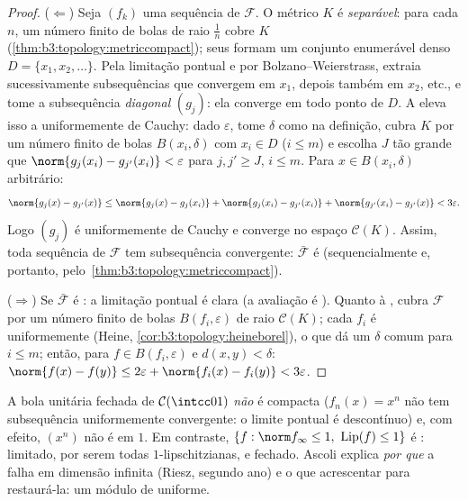 \begin{proof}
($\Leftarrow$) Seja $(f_k)$ uma sequência de $\mathcal F$. O  métrico
$K$ é \emph{separável}: para cada $n$, um número finito de bolas
de raio $\frac1n$ cobre $K$ (\cref{thm:b3:topology:metriccompact}); seus  formam um
conjunto enumerável denso $D = \{x_1, x_2, \dots\}$. Pela limitação pontual e por
Bolzano--Weierstrass, extraia sucessivamente subsequências que
convergem em $x_1$, depois também em $x_2$, etc., e tome a
subsequência \emph{diagonal} $(g_j)$: ela converge em todo ponto de
$D$. A  eleva isso a uniformemente de Cauchy: dado
$\varepsilon$, tome $\delta$ como na definição, cubra $K$ por um número
finito de bolas $B(x_i, \delta)$ com $x_i \in D$ ($i \leq m$) e escolha $J$ tão grande que
$\norm{g_j(x_i) - g_{j'}(x_i)} < \varepsilon$ para $j, j' \geq
J$, $i \leq m$. Para $x \in B(x_i, \delta)$ arbitrário:
\[
\norm{g_j(x) - g_{j'}(x)}
\leq \norm{g_j(x) - g_j(x_i)} + \norm{g_j(x_i) - g_{j'}(x_i)}
+ \norm{g_{j'}(x_i) - g_{j'}(x)} < 3\varepsilon .
\]
Logo $(g_j)$ é uniformemente de Cauchy e converge no espaço 
$\mathcal C(K)$. Assim, toda sequência de $\mathcal F$ tem subsequência convergente:
$\bar{\mathcal F}$ é  (sequencialmente e, portanto, pelo~\cref{thm:b3:topology:metriccompact}).

($\Rightarrow$) Se $\bar{\mathcal F}$ é : a limitação pontual é clara (a avaliação é
). Quanto à , cubra $\mathcal F$ por um número finito
de bolas $B(f_i, \varepsilon)$ de raio $\mathcal C(K)$; cada $f_i$ é uniformemente 
(Heine, \cref{cor:b3:topology:heineborel}), o que dá um $\delta$ comum para $i \leq m$;
então, para $f \in B(f_i, \varepsilon)$ e $d(x,y)
< \delta$: $\norm{f(x)-f(y)} \leq 2\varepsilon +
\norm{f_i(x)-f_i(y)} < 3\varepsilon$.
\end{proof}

\begin{example}\label{ex:b3:complete:ascoliexamples}
A bola unitária fechada de $\mathcal C(\intcc01)$ \emph{não} é compacta ($f_n(x) = x^n$ não tem
subsequência uniformemente convergente: o limite pontual é
descontínuo) e, com efeito, $(x^n)$ não é  em $1$.
Em contraste, $\{f : \norm
f_\infty \leq 1,\ \operatorname{Lip}(f) \leq 1\}$ é : limitado,  por serem todas
$1$-lipschitzianas, e fechado. Ascoli explica \emph{por que} a
 falha em dimensão infinita (Riesz, segundo ano) e o que
acrescentar para restaurá-la: um módulo de  uniforme.
\end{example}

